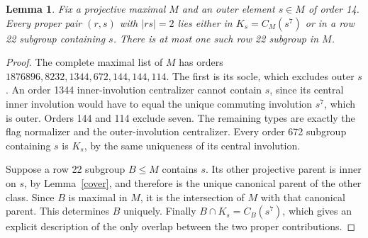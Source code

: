 \documentclass[11pt,a4paper]{article}
\newtheorem{lemma}{Lemma}\newtheorem{theorem}{Theorem}
\begin{document}
\begin{lemma}\label{proper}
Fix a projective maximal $M$ and an outer element $s\in M$ of
order 14. Every proper pair $(r,s)$ with $|rs|=2$ lies either
in $K_s=C_M(s^7)$ or in a row 22 subgroup containing $s$.
There is at most one such row 22 subgroup in $M$.
\end{lemma}
\begin{proof}
The complete maximal list of $M$ has orders
$1876896,8232,1344,672,144,144,114$. The first is its socle,
which excludes outer $s$. An order 1344 inner-involution
centralizer cannot contain $s$, since its central inner involution
would have to equal the unique commuting involution $s^7$,
which is outer. Orders 144 and 114 exclude seven. The remaining
types are exactly the flag normalizer and the outer-involution
centralizer. Every order 672 subgroup containing $s$ is $K_s$,
by the same uniqueness of its central involution.

Suppose a row 22 subgroup $B\leq M$ contains $s$. Its other
projective parent is inner on $s$, by Lemma~\ref{cover}, and
therefore is the unique canonical parent of the other class.
Since $B$ is maximal in $M$, it is the intersection of $M$
with that canonical parent. This determines $B$ uniquely.
Finally $B\cap K_s=C_B(s^7)$, which gives an explicit description
of the only overlap between the two proper contributions.
\end{proof}
\end{document}
